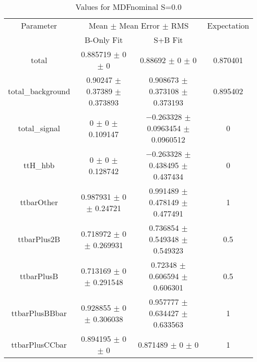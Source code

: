 \begin{table}
\centering
\caption{Values for MDFnominal S=0.0}
\begin{tabular}{cccc}
\toprule
Parameter & \multicolumn{2}{c}{Mean $\pm$ Mean Error $\pm$ RMS} & Expectation\\
 & B-Only Fit & S+B Fit & \\
\midrule
total & \num{0.885719} $\pm$ \num{0} $\pm$ \num{0} & \num{0.88692} $\pm$ \num{0} $\pm$ \num{0} & \num{0.870401}\\
total\_background & \num{0.90247} $\pm$ \num{0.37389} $\pm$ \num{0.373893} & \num{0.908673} $\pm$ \num{0.373108} $\pm$ \num{0.373193} & \num{0.895402}\\
total\_signal & \num{0} $\pm$ \num{0} $\pm$ \num{0.109147} & \num{-0.263328} $\pm$ \num{0.0963454} $\pm$ \num{0.0960512} & \num{0}\\
ttH\_hbb & \num{0} $\pm$ \num{0} $\pm$ \num{0.128742} & \num{-0.263328} $\pm$ \num{0.438495} $\pm$ \num{0.437434} & \num{0}\\
ttbarOther & \num{0.987931} $\pm$ \num{0} $\pm$ \num{0.24721} & \num{0.991489} $\pm$ \num{0.478149} $\pm$ \num{0.477491} & \num{1}\\
ttbarPlus2B & \num{0.718972} $\pm$ \num{0} $\pm$ \num{0.269931} & \num{0.736854} $\pm$ \num{0.549348} $\pm$ \num{0.549323} & \num{0.5}\\
ttbarPlusB & \num{0.713169} $\pm$ \num{0} $\pm$ \num{0.291548} & \num{0.72348} $\pm$ \num{0.606594} $\pm$ \num{0.606301} & \num{0.5}\\
ttbarPlusBBbar & \num{0.928855} $\pm$ \num{0} $\pm$ \num{0.306038} & \num{0.957777} $\pm$ \num{0.634427} $\pm$ \num{0.633563} & \num{1}\\
ttbarPlusCCbar & \num{0.894195} $\pm$ \num{0} $\pm$ \num{0} & \num{0.871489} $\pm$ \num{0} $\pm$ \num{0} & \num{1}\\
\bottomrule
\end{tabular}
\end{table}